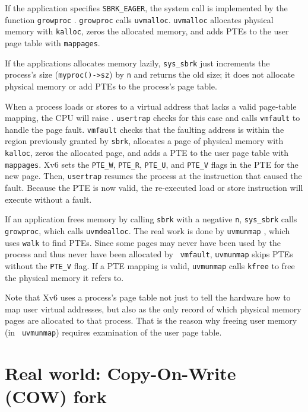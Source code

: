If the application specifies \lstinline{SBRK_EAGER}, the system
call is implemented by the function
\lstinline{growproc}
.
\lstinline{growproc} calls \lstinline{uvmalloc}.
\lstinline{uvmalloc}
allocates physical memory with {\tt kalloc}, zeros the allocated memory,
and adds PTEs to the user page table with {\tt mappages}.

If the applications allocates memory lazily, \lstinline{sys_sbrk}
just increments the process's size
(\lstinline{myproc()->sz}) by {\tt n} and returns the old size; it does
not allocate physical memory or add PTEs to the process's page table.

When a process loads or stores to a virtual address that
lacks a valid page-table mapping, the CPU will
raise .
\lstinline{usertrap} checks for this case
and calls \lstinline{vmfault}
to handle the page fault.  \lstinline{vmfault}
checks that the faulting address is within the
region previously granted by {\tt sbrk},
allocates a page of physical memory with {\tt kalloc},
zeros the allocated page, and adds a PTE to the user page table with
{\tt mappages}.  Xv6 sets the \lstinline{PTE_W}, \lstinline{PTE_R},
\lstinline{PTE_U}, and \lstinline{PTE_V} flags in the PTE for the
new page. Then, \lstinline{usertrap} resumes the
process at the instruction that caused the fault. Because the
PTE is now valid, the re-executed load or store instruction
will execute without a fault.

If an application frees memory by calling {\tt sbrk} with a
negative {\tt n}, \lstinline{sys_sbrk} calls \lstinline{growproc},
which calls \lstinline{uvmdealloc}.  The
real work is done by {\tt uvmunmap} ,
which uses {\tt walk} to find PTEs.  Since some pages may never have
been used by the process and thus never have been allocated by {\tt
  vmfault}, {\tt uvmunmap} skips PTEs without the \lstinline{PTE_V}
flag.  If a PTE mapping is valid, {\tt uvmunmap} calls {\tt kfree}
to free the physical memory it refers to.

Note that Xv6 uses a process's page table not just to tell the
hardware how to map user virtual addresses, but also as the only
record of which physical memory pages are allocated to that
process. That is the reason why freeing user memory (in {\tt
  uvmunmap}) requires examination of the user page table.

\section{Real world: Copy-On-Write (COW) fork}

